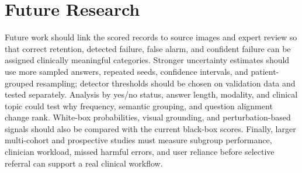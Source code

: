 \section{Future Research}

Future work should link the scored records to source images and expert review so that correct retention, detected failure, false alarm, and confident failure can be assigned clinically meaningful categories. Stronger uncertainty estimates should use more sampled answers, repeated seeds, confidence intervals, and patient-grouped resampling; detector thresholds should be chosen on validation data and tested separately. Analysis by yes/no status, answer length, modality, and clinical topic could test why frequency, semantic grouping, and question alignment change rank. White-box probabilities, visual grounding, and perturbation-based signals should also be compared with the current black-box scores. Finally, larger multi-cohort and prospective studies must measure subgroup performance, clinician workload, missed harmful errors, and user reliance before selective referral can support a real clinical workflow.
